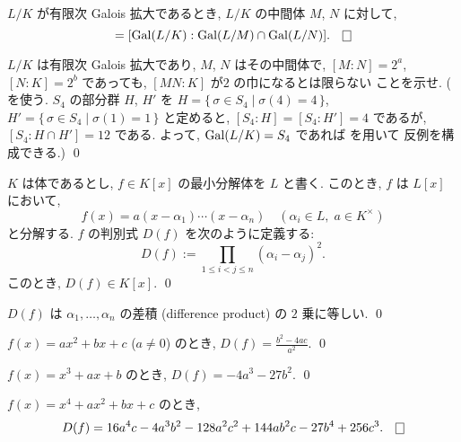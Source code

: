 \documentclass[12pt,twoside]{jarticle}
\begin{document}
\begin{question}\label{q:Gal:GalcapGal}
  $L/K$ が有限次 Galois 拡大であるとき, $L/K$ の中間体 $M$, $N$ に対して,
  \begin{equation*}
    [MN:L] = [\Gal(L/K):\Gal(L/M)\cap\Gal(L/N)]. \qed
  \end{equation*}
\end{question}

\begin{question}
  $L/K$ は有限次 Galois 拡大であり, $M$, $N$ はその中間体で,
  $[M:N]=2^a$, $[N:K]=2^b$ であっても, $[MN:K]$ が$2$ の巾になるとは限らない
  ことを示せ. 
  ( を使う. $S_4$ の部分群 $H$, $H'$ を %
  $H = \{\,\sigma\in S_4\mid\sigma(4)=4\,\}$,
  $H' = \{\,\sigma\in S_4\mid\sigma(1)=1\,\}$ と定めると,
  $[S_4:H]=[S_4:H']=4$ であるが, $[S_4:H\cap H']=12$ である.
  よって, $\mathop{\mathrm{Gal}}\nolimits(L/K)=S_4$ であれば  を用いて
  反例を構成できる.)
  \qed
\end{question}

\begin{question}
  $K$ は体であるとし, $f\in K[x]$ の最小分解体を $L$ と書く.
  このとき, $f$ は $L[x]$ において,
  \begin{equation*}
    f(x) = a (x - \alpha_1)\cdots(x - \alpha_n)
    \quad
    (\alpha_i\in L,\; a\in K^\times)
  \end{equation*}
  と分解する.  $f$ の判別式 $D(f)$ を次のように定義する:
  \begin{equation*}
    D(f) := \prod_{1\le i<j\le n} (\alpha_i - \alpha_j)^2.
  \end{equation*}
  このとき, $D(f)\in K[x]$.  \qed
\end{question}

\begin{rem}
  $D(f)$ は $\alpha_1,\ldots,\alpha_n$ の差積 (difference product) 
  の $2$ 乗に等しい. \qed
\end{rem}

\begin{question}
  $f(x)=ax^2+bx+c$ ($a\ne0$) のとき,
  $\displaystyle D(f)=\frac{b^2-4ac}{a^2}$. \qed
\end{question}

\begin{question}
  $f(x)=x^3+ax+b$ のとき,
  $D(f)=-4a^3-27b^2$. \qed
\end{question}

\begin{question}
  $f(x)=x^4+ax^2+bx+c$ のとき,
  \begin{equation*}
    D(f) = 16a^4c - 4a^3b^2 - 128a^2c^2 + 144ab^2c - 27b^4 + 256c^3.
    \qed
  \end{equation*}
\end{question}
\end{document}
